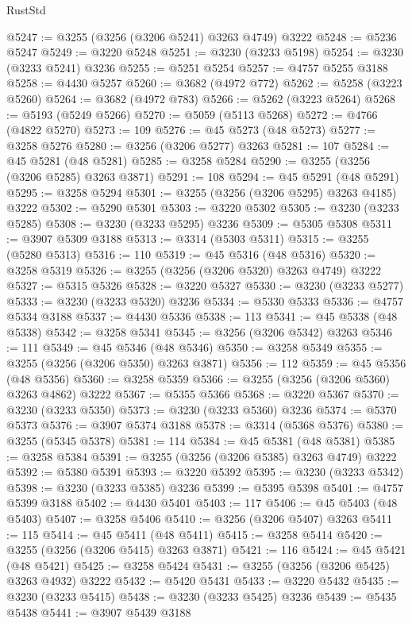 \begin{lexlean}{RustStd}
\begin{coremodule}
{\begin{coremodule}
{{{{{{{{{{{{{{{{{{{{{{{{{{{{{{{{{{{{{@5247 := @3255 (@3256 (@3206 @5241) @3263 @4749) @3222
@5248 := @5236 @5247
@5249 := @3220 @5248
@5251 := @3230 (@3233 @5198)
@5254 := @3230 (@3233 @5241) @3236
@5255 := @5251 @5254
@5257 := @4757 @5255 @3188
@5258 := @4430 @5257
@5260 := @3682 (@4972 @772)
@5262 := @5258 (@3223 @5260)
@5264 := @3682 (@4972 @783)
@5266 := @5262 (@3223 @5264)
@5268 := @5193 (@5249 @5266)
@5270 := @5059 (@5113 @5268)
@5272 := @4766 (@4822 @5270)
@5273 := 109
@5276 := @45 @5273 (@48 @5273)
@5277 := @3258 @5276
@5280 := @3256 (@3206 @5277) @3263
@5281 := 107
@5284 := @45 @5281 (@48 @5281)
@5285 := @3258 @5284
@5290 := @3255 (@3256 (@3206 @5285) @3263 @3871)
@5291 := 108
@5294 := @45 @5291 (@48 @5291)
@5295 := @3258 @5294
@5301 := @3255 (@3256 (@3206 @5295) @3263 @4185) @3222
@5302 := @5290 @5301
@5303 := @3220 @5302
@5305 := @3230 (@3233 @5285)
@5308 := @3230 (@3233 @5295) @3236
@5309 := @5305 @5308
@5311 := @3907 @5309 @3188
@5313 := @3314 (@5303 @5311)
@5315 := @3255 (@5280 @5313)
@5316 := 110
@5319 := @45 @5316 (@48 @5316)
@5320 := @3258 @5319
@5326 := @3255 (@3256 (@3206 @5320) @3263 @4749) @3222
@5327 := @5315 @5326
@5328 := @3220 @5327
@5330 := @3230 (@3233 @5277)
@5333 := @3230 (@3233 @5320) @3236
@5334 := @5330 @5333
@5336 := @4757 @5334 @3188
@5337 := @4430 @5336
@5338 := 113
@5341 := @45 @5338 (@48 @5338)
@5342 := @3258 @5341
@5345 := @3256 (@3206 @5342) @3263
@5346 := 111
@5349 := @45 @5346 (@48 @5346)
@5350 := @3258 @5349
@5355 := @3255 (@3256 (@3206 @5350) @3263 @3871)
@5356 := 112
@5359 := @45 @5356 (@48 @5356)
@5360 := @3258 @5359
@5366 := @3255 (@3256 (@3206 @5360) @3263 @4862) @3222
@5367 := @5355 @5366
@5368 := @3220 @5367
@5370 := @3230 (@3233 @5350)
@5373 := @3230 (@3233 @5360) @3236
@5374 := @5370 @5373
@5376 := @3907 @5374 @3188
@5378 := @3314 (@5368 @5376)
@5380 := @3255 (@5345 @5378)
@5381 := 114
@5384 := @45 @5381 (@48 @5381)
@5385 := @3258 @5384
@5391 := @3255 (@3256 (@3206 @5385) @3263 @4749) @3222
@5392 := @5380 @5391
@5393 := @3220 @5392
@5395 := @3230 (@3233 @5342)
@5398 := @3230 (@3233 @5385) @3236
@5399 := @5395 @5398
@5401 := @4757 @5399 @3188
@5402 := @4430 @5401
@5403 := 117
@5406 := @45 @5403 (@48 @5403)
@5407 := @3258 @5406
@5410 := @3256 (@3206 @5407) @3263
@5411 := 115
@5414 := @45 @5411 (@48 @5411)
@5415 := @3258 @5414
@5420 := @3255 (@3256 (@3206 @5415) @3263 @3871)
@5421 := 116
@5424 := @45 @5421 (@48 @5421)
@5425 := @3258 @5424
@5431 := @3255 (@3256 (@3206 @5425) @3263 @4932) @3222
@5432 := @5420 @5431
@5433 := @3220 @5432
@5435 := @3230 (@3233 @5415)
@5438 := @3230 (@3233 @5425) @3236
@5439 := @5435 @5438
@5441 := @3907 @5439 @3188
}}}}}}}}}}}}}}}}}}}}}}}}}}}}}}}}}}}}}
\end{coremodule}}
\end{coremodule}
\end{lexlean}

